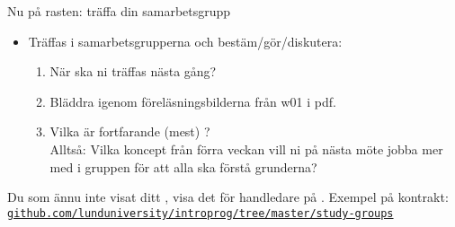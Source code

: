 \begin{SlideExtra}{Nu på rasten: träffa din samarbetsgrupp}
\begin{itemize}
\item Träffas i samarbetsgrupperna och bestäm/gör/diskutera:
\begin{enumerate}
\item När ska ni träffas nästa gång?
\item Bläddra igenom föreläsningsbilderna från w01 i pdf.
\item Vilka  är fortfarande (mest) ? \\Alltså: Vilka koncept från förra veckan vill ni på nästa möte jobba mer med i gruppen för att alla ska förstå grunderna?
\end{enumerate}
\end{itemize}
\vspace{1em}Du som ännu inte visat ditt , visa det för handledare på . Exempel på kontrakt:
\\\href{https://github.com/lunduniversity/introprog/tree/master/study-groups}{\footnotesize\texttt{github.com/lunduniversity/introprog/tree/master/study-groups}}
\end{SlideExtra}


